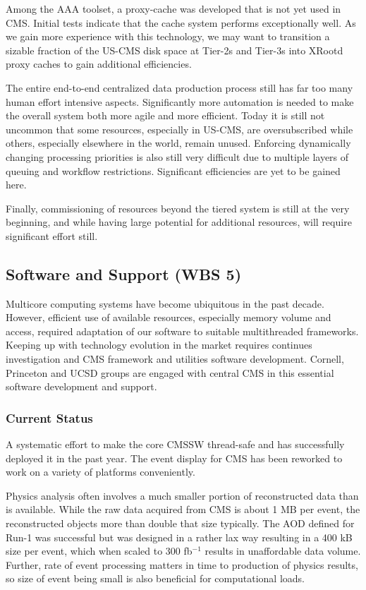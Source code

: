 \documentclass[11pt,a4paper]{article}
\begin{document}
Among the AAA toolset, a proxy-cache was developed that is not yet used in CMS. 
Initial tests indicate that the cache system performs exceptionally well. As we gain more experience with this technology, 
we may want to transition a sizable  fraction of the US-CMS disk space at Tier-2s and Tier-3s into XRootd proxy caches
to gain additional efficiencies.

The entire end-to-end centralized data production process still has far too many human effort intensive aspects.
Significantly more automation is needed to make the overall system both more agile and more efficient. Today it is still not uncommon
that some resources, especially in US-CMS, are oversubscribed while others, especially elsewhere in the world, remain unused. 
Enforcing dynamically changing processing priorities is also still very difficult due to multiple layers of queuing and workflow
restrictions. Significant efficiencies are yet to be gained here.

Finally, commissioning of resources beyond the tiered system is still at the very beginning, and while having large potential
for additional resources, will require significant effort still.

\subsection{Software and Support (WBS 5)}

Multicore computing systems have become ubiquitous in the past
decade. However, efficient use of available resources, especially
memory volume and access, required adaptation of our software to
suitable multithreaded frameworks. Keeping up with technology
evolution in the market requires continues investigation and CMS
framework and utilities software development.  Cornell, Princeton and
UCSD groups are engaged with central CMS in this essential software
development and support.

\subsubsection{Current Status}

A systematic effort to make the core CMSSW thread-safe and has
successfully deployed it in the past year.  The event display
for CMS has been reworked to work on a variety of platforms
conveniently.


Physics analysis often involves a much smaller portion of
reconstructed data than is available. While the raw data acquired from
CMS is about 1 MB per event, the reconstructed objects more than
double that size typically. The AOD defined for Run-1 was successful
but was designed in a rather lax way resulting in a 400 kB size per
event, which when scaled to 300 fb$^{-1}$ results in unaffordable
data volume. Further, rate of event processing matters in time to
production of physics results, so size of event being small is also
beneficial for computational loads. 
\end{document}
